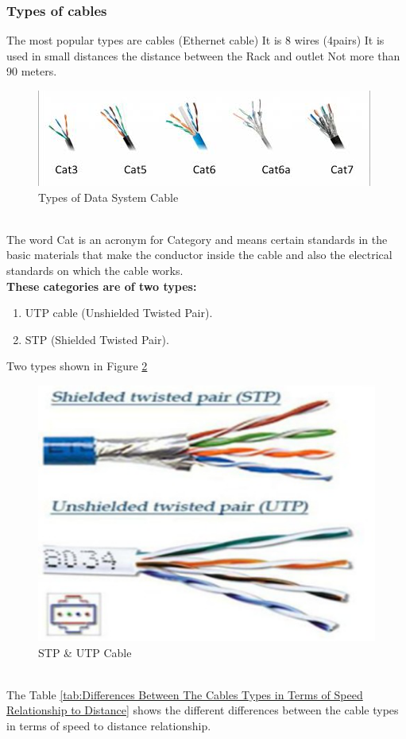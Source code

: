 \documentclass[12pt,fleqn]{book} %
\begin{document}
\subsubsection{Types of cables}
The most popular types are cables (Ethernet cable) It is 8 wires (4pairs) It is used in small distances the distance between the Rack and outlet Not more than 90 meters.
\begin{figure}[!h]
    \centering
    \includegraphics[width=1\linewidth]{hamdy 57.png}
    \caption{Types of Data System Cable}
    \label{fig:hamdy 57}
    \end{figure}
\\ The word Cat is an acronym for Category and means certain standards in the basic materials that make the conductor inside the cable and also the electrical standards on which the cable works.
\\ \textbf{These categories are of two types:}
\begin{enumerate}
    \item UTP cable (Unshielded Twisted Pair).
    \item STP (Shielded Twisted Pair).
\end{enumerate}
Two types shown in Figure \ref{fig:hamdy 58}
\begin{figure}[!h]
    \centering
    \includegraphics[width=0.5\linewidth]{hamdy 58.png}
    \caption{STP & UTP Cable}
    \label{fig:hamdy 58}
    \end{figure}
\\ The Table \ref{tab:Differences Between The Cables Types in Terms of Speed Relationship to Distance} shows the different differences between the cable types in terms of speed to distance relationship. 
\end{document}

